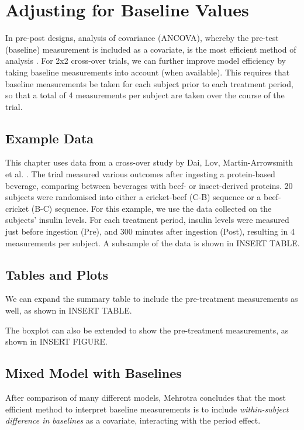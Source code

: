 \documentclass[12pt, TexShade, letterpaper]{report}
\begin{document}
\section{Adjusting for Baseline Values}
In pre-post designs, analysis of covariance (ANCOVA), whereby the pre-test (baseline) measurement is included as a covariate, is the most efficient method of analysis \cite{wan2021statistical}. For 2x2 cross-over trials, we can further improve model efficiency by taking baseline measurements into account (when available). This requires that baseline measurements be taken for each subject prior to each treatment period, so that a total of 4 measurements per subject are taken over the course of the trial.

\subsection{Example Data}
This chapter uses data from a cross-over study by Dai, Lov, Martin-Arrowsmith et al. \cite{dai2022insect}. The trial measured various outcomes after ingesting a protein-based beverage, comparing between beverages with beef- or insect-derived proteins. 20 subjects were randomised into either a cricket-beef (C-B) sequence or a beef-cricket (B-C) sequence. For this example, we use the data collected on the subjects' insulin levels. For each treatment period, insulin levels were measured just before ingestion (Pre), and 300 minutes after ingestion (Post), resulting in 4 measurements per subject. A subsample of the data is shown in INSERT TABLE. 

\subsection{Tables and Plots}
We can expand the summary table to include the pre-treatment measurements as well, as shown in INSERT TABLE.

The boxplot can also be extended to show the pre-treatment measurements, as shown in INSERT FIGURE.

\subsection{Mixed Model with Baselines}
After comparison of many different models, Mehrotra \cite{mehrotra2014} concludes that the most efficient method to interpret baseline measurements is to include \textit{within-subject difference in baselines} as a covariate, interacting with the period effect.
\end{document}

